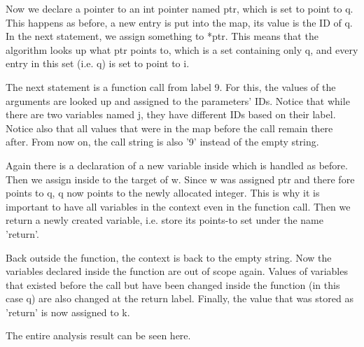 \documentclass[a4paper,11pt]{article}
\begin{document}
Now we declare a pointer to an int pointer named ptr, which is set to point to q. This happens as before, a new entry is put into the map, its value is the ID of q. In the next statement, we assign something to *ptr. This means that the algorithm looks up what ptr points to, which is a set containing only q, and every entry in this set (i.e. q) is set to point to i. 

The next statement is a function call from label 9. For this, the values of the arguments are looked up and assigned to the parameters' IDs. Notice that while there are two variables named j, they have different IDs based on their label. Notice also that all values that were in the map before the call remain there after. From now on, the call string is also '9' instead of the empty string.

Again there is a declaration of a new variable inside which is handled as before. Then we assign inside to the target of w. Since w was assigned ptr and there fore points to q, q now points to the newly allocated integer. This is why it is important to have all variables in the context even in the function call. Then we return a newly created variable, i.e. store its points-to set under the name 'return'. 

Back outside the function, the context is back to the empty string. Now the variables declared inside the function are out of scope again. Values of variables that existed before the call but have been changed inside the function (in this case q) are also changed at the return label. Finally, the value that was stored as 'return' is now assigned to k.

The entire analysis result can be seen here. 


\end{document}
